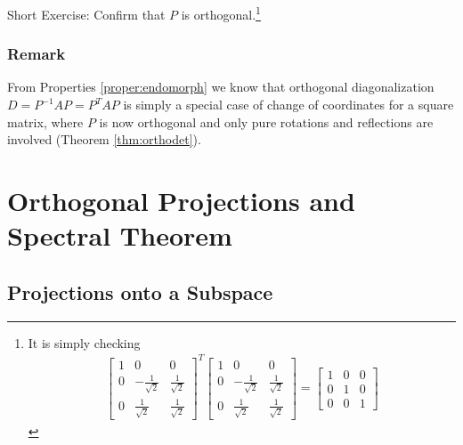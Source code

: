 Short Exercise: Confirm that $P$ is orthogonal.\footnote{It is simply checking
\begin{align*}
\begin{bmatrix}
1 & 0 & 0 \\
0 & -\frac{1}{\sqrt{2}} & \frac{1}{\sqrt{2}} \\
0 & \frac{1}{\sqrt{2}} & \frac{1}{\sqrt{2}}
\end{bmatrix}^T
\begin{bmatrix}
1 & 0 & 0 \\
0 & -\frac{1}{\sqrt{2}} & \frac{1}{\sqrt{2}} \\
0 & \frac{1}{\sqrt{2}} & \frac{1}{\sqrt{2}}
\end{bmatrix} = 
\begin{bmatrix}
1 & 0 & 0 \\
0 & 1 & 0 \\
0 & 0 & 1
\end{bmatrix}
\end{align*}
}

\subsubsection{Remark} From Properties \ref{proper:endomorph} we know that orthogonal diagonalization $D = P^{-1}AP = P^TAP$ is simply a special case of change of coordinates for a square matrix, where $P$ is now orthogonal and only pure rotations and reflections are involved (Theorem \ref{thm:orthodet}).

\section{Orthogonal Projections and Spectral Theorem}

\subsection{Projections onto a Subspace}

